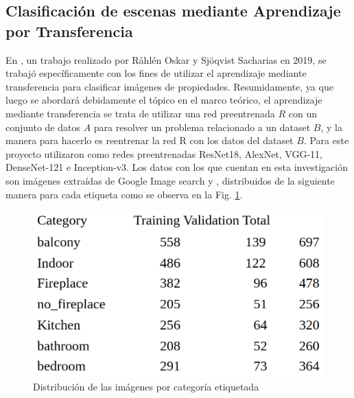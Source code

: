 \subsection{Clasificación de escenas mediante Aprendizaje por Transferencia} \label{ssec:transfer_learning}
En \cite{raahlen2019image}, un trabajo realizado por R{\aa}hl{\'e}n Oskar y Sj{\"o}qvist Sacharias en 2019, se trabajó específicamente con los fines de utilizar el aprendizaje mediante transferencia para clasificar imágenes de propiedades.
Resumidamente, ya que luego se abordará debidamente el tópico en el marco teórico, el aprendizaje mediante transferencia se trata de utilizar una red preentrenada \(R\) con un conjunto de datos \(A\) para resolver un problema relacionado a un dataset \(B\), y la manera para hacerlo es reentrenar la red R con los datos del dataset \(B\). Para este proyecto utilizaron como redes preentrenadas ResNet18, AlexNet, VGG-11, DenseNet-121 e Inception-v3.
Los datos con los que cuentan en esta investigación son imágenes extraídas de Google Image search y \cite{hemnet}, distribuidos de la siguiente manera para cada etiqueta como se observa en la Fig. \ref{fig:transferlearningdataset}.
\begin{figure}[h!]
	\centering
	\includegraphics[width=0.7\linewidth]{images/transfer_learning_dataset}
	\caption[Distribución de las imágenes por categoría etiquetada]{Distribución de las imágenes por categoría etiquetada}
	\label{fig:transferlearningdataset}
\end{figure}


